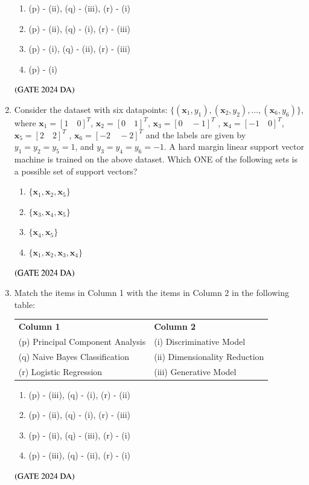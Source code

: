 \documentclass[journal,12pt,onecolumn]{IEEEtran}
\theoremstyle{remark}
\begin{document}
\begin{enumerate}[resume]
\begin{multicols}{2}
\begin{enumerate}
\item (p) - (ii), (q) - (iii), (r) - (i)
\item (p) - (ii), (q) - (i), (r) - (iii)
\item (p) - (i), (q) - (ii), (r) - (iii)
\item (p) - (i)
\end{enumerate}
\end{multicols}
\hfill $\left(\text{GATE 2024 DA}\right)$


\item Consider the dataset with six datapoints: $\{(\boldsymbol{x}_1, y_1), (\boldsymbol{x}_2,y_2),\dots , (\boldsymbol{x}_6,y_6)\}$, where $\boldsymbol{x}_1 = [1 \quad 0]^T$, $\boldsymbol{x}_2 = [0 \quad 1]^T$, $\boldsymbol{x}_3 = [0 \quad -1]^T$ , $\boldsymbol{x}_4 = [-1 \quad 0]^T$, $\boldsymbol{x}_5 = [2 \quad 2]^T$ , $\boldsymbol{x}_6 = [-2 \quad -2]^T$ and the labels are given by $y_1 = y_2 = y_5 = 1$, and $y_3 = y_4 = y_6 = -1$. A hard margin linear support vector machine is trained on the above dataset. Which ONE of the following sets is a possible set of support vectors?
\begin{multicols}{4}
\begin{enumerate}

\item $\{\boldsymbol{x}_1, \boldsymbol{x}_2, \boldsymbol{x}_5\}$
\item $\{\boldsymbol{x}_3, \boldsymbol{x}_4, \boldsymbol{x}_5\}$
\item $\{\boldsymbol{x}_4, \boldsymbol{x}_5\}$
\item $\{\boldsymbol{x}_1, \boldsymbol{x}_2, \boldsymbol{x}_3, \boldsymbol{x}_4\}$
\end{enumerate}
\end{multicols}
\hfill $\left(\text{GATE 2024 DA}\right)$


\item Match the items in Column 1 with the items in Column 2 in the following table:
\begin{center}
\begin{tabular}{ll}
\textbf{Column 1} & \textbf{Column 2} \\
(p) Principal Component Analysis & (i) Discriminative Model \\
(q) Naive Bayes Classification & (ii) Dimensionality Reduction \\
(r) Logistic Regression & (iii) Generative Model \\
\end{tabular}
\end{center}
\begin{multicols}{2}
\begin{enumerate}
\item (p) - (iii), (q) - (i), (r) - (ii)
\item (p) - (ii), (q) - (i), (r) - (iii)
\item (p) - (ii), (q) - (iii), (r) - (i)
\item (p) - (iii), (q) - (ii), (r) - (i)
\end{enumerate}
\end{multicols}
\hfill $\left(\text{GATE 2024 DA}\right)$



\end{enumerate}
\end{document}
